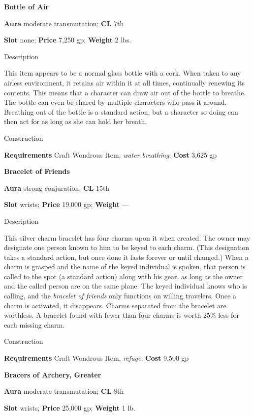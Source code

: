 \textbf{Bottle of Air}
				
\textbf{Aura} moderate transmutation;\textbf{ CL }7th
				
\textbf{Slot} none; \textbf{Price} 7,250 gp; \textbf{Weight} 2 lbs.
				
Description
				
This item appears to be a normal glass bottle with a cork. When taken to any airless environment, it retains air within it at all times, continually renewing its contents. This means that a character can draw air out of the bottle to breathe. The bottle can even be shared by multiple characters who pass it around. Breathing out of the bottle is a standard action, but a character so doing can then act for as long as she can hold her breath. 
				
Construction
				
\textbf{Requirements} Craft Wondrous Item, \textit{water breathing}; \textbf{Cost }3,625 gp
				
\textbf{Bracelet of Friends}
				
\textbf{Aura} strong conjuration;\textbf{ CL }15th
				
\textbf{Slot} wrists; \textbf{Price} 19,000 gp; \textbf{Weight }---
				
Description
				
This silver charm bracelet has four charms upon it when created. The owner may designate one person known to him to be keyed to each charm. (This designation takes a standard action, but once done it lasts forever or until changed.) When a charm is grasped and the name of the keyed individual is spoken, that person is called to the spot (a standard action) along with his gear, as long as the owner and the called person are on the same plane. The keyed individual knows who is calling, and the \textit{bracelet of friends }only functions on willing travelers. Once a charm is activated, it disappears. Charms separated from the bracelet are worthless. A bracelet found with fewer than four charms is worth 25\% less for each missing charm. 
				
Construction
				
\textbf{Requirements} Craft Wondrous Item, \textit{refuge}; \textbf{Cost }9,500 gp
				
\textbf{Bracers of Archery, Greater}
				
\textbf{Aura} moderate transmutation;\textbf{ CL }8th
				
\textbf{Slot} wrists; \textbf{Price} 25,000 gp; \textbf{Weight} 1 lb.
				
